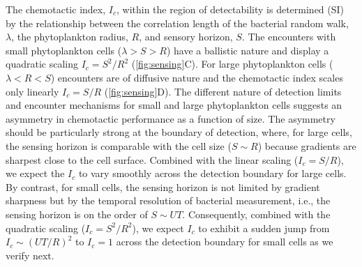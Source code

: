 \documentclass[9pt,twocolumn,twoside]{pnas-new}
\begin{document}
The chemotactic index, $I_c$, within the region of detectability is determined (SI) by the relationship between the correlation length of the bacterial random walk, $\lambda$, the phytoplankton radius, $R$, and sensory horizon, $S$. The encounters with small phytoplankton cells ($\lambda>S>R$) have a ballistic nature and display a quadratic scaling $I_c = S^2/R^2$ (\autoref{fig:sensing}C). For large phytoplankton cells ($\lambda < R < S$) encounters are of diffusive nature and the chemotactic index scales only linearly $I_c = S/R$ (\autoref{fig:sensing}D).
The different nature of detection limits and encounter mechanisms for small and large phytoplankton cells suggests an asymmetry in chemotactic performance as a function of size. The asymmetry should be particularly strong at the boundary of detection, where, for large cells, the sensing horizon is comparable with the cell size ($S\sim R$) because gradients are sharpest close to the cell surface. Combined with the linear scaling ($I_c=S/R$), we expect the $I_c$ to vary smoothly across the detection boundary for large cells. By contrast, for small cells, the sensing horizon is not limited by gradient sharpness but by the temporal resolution of bacterial measurement, i.e., the sensing horizon is on the order of $S\sim UT$. Consequently, combined with the quadratic scaling ($I_c = S^2/R^2$), we expect $I_c$ to exhibit a sudden jump from $I_c \sim (UT/R)^2$ to $I_c = 1$ across the detection boundary for small cells as we verify next. 
\end{document}
